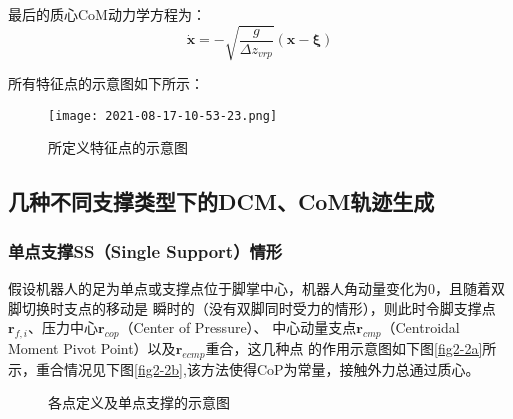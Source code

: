             最后的质心CoM动力学方程为：
            \begin{equation}
                \boldsymbol{\dot{x}}=-\sqrt{\frac{g}{\varDelta z_{vrp}}}\left( \boldsymbol{x}-\boldsymbol{\xi } \right) 
                \label{equ2-9}
            \end{equation}

            所有特征点的示意图如下所示：
            \begin{figure}[h] 
                \centering
                \texttt{[image: 2021-08-17-10-53-23.png]}
                \caption{所定义特征点的示意图} \label{fig2-1}
            \end{figure}
    \subsection{几种不同支撑类型下的DCM、CoM轨迹生成}
        \subsubsection{单点支撑SS（Single Support）情形}
            假设机器人的足为单点或支撑点位于脚掌中心，机器人角动量变化为0，且随着双脚切换时支点的移动是
            瞬时的（没有双脚同时受力的情形），则此时令脚支撑点$\boldsymbol{r}_{f,i}$、压力中心$\boldsymbol{r}_{cop}$（Center of Pressure）、
            中心动量支点$\boldsymbol{r}_{cmp}$（Centroidal Moment Pivot Point）以及$\boldsymbol{r}_{ecmp}$重合，这几种点
            的作用示意图如下图\ref{fig2-2a}所示，重合情况见下图\ref{fig2-2b},该方法使得CoP为常量，接触外力总通过质心。
            \begin{figure}[h] 
                \centering
                \vspace{10pt} %
                \caption{各点定义及单点支撑的示意图} \label{fig2-2}
            \end{figure}

